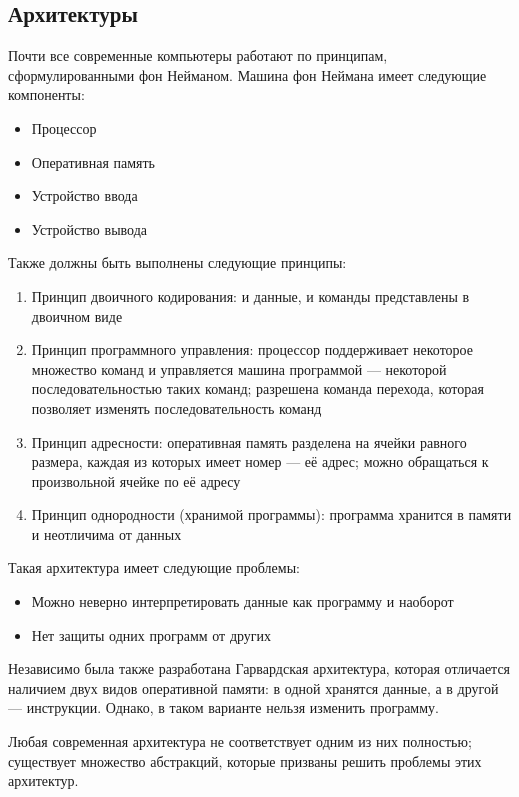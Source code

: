 \documentclass[main]{subfiles}
\begin{document}
\subsection{Архитектуры}
Почти все современные компьютеры работают по принципам, сформулированными
фон Нейманом. Машина фон Неймана имеет следующие компоненты:
\begin{itemize}
\item Процессор
\item Оперативная память
\item Устройство ввода
\item Устройство вывода
\end{itemize}
Также должны быть выполнены следующие принципы:
\begin{enumerate}
\item Принцип двоичного кодирования: и данные, и команды представлены в
двоичном виде
\item Принцип программного управления: процессор поддерживает некоторое
множество команд и управляется машина программой --- некоторой
последовательностью таких команд; разрешена команда перехода, которая
позволяет изменять последовательность команд
\item Принцип адресности: оперативная память разделена на
ячейки равного размера, каждая из которых имеет номер --- её адрес;
можно обращаться к произвольной ячейке по её адресу
\item Принцип однородности (хранимой программы):
программа хранится в памяти и неотличима от данных
\end{enumerate}

Такая архитектура имеет следующие проблемы:
\begin{itemize}
\item Можно неверно интерпретировать данные как программу и наоборот
\item Нет защиты одних программ от других
\end{itemize}

Независимо была также разработана Гарвардская архитектура, которая
отличается наличием двух видов оперативной памяти:
в одной хранятся данные, а в другой --- инструкции.
Однако, в таком варианте нельзя изменить программу.

\begin{remark}
Любая современная архитектура не соответствует одним из них полностью;
существует множество абстракций, которые призваны решить проблемы
этих архитектур.
\end{remark}
\end{document}
